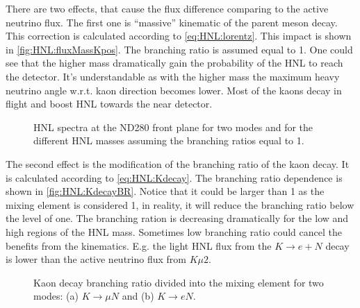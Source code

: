 \documentclass[../main.tex]{subfiles}
\begin{document}
There are two effects, that cause the flux difference comparing to the active neutrino flux. The first one is ``massive'' kinematic of the parent meson decay. This correction is calculated according to \autoref{eq:HNL:lorentz}. This impact is shown in \autoref{fig:HNL:fluxMassKpos}. The branching ratio is assumed equal to 1. One could see that the higher mass dramatically gain the probability of the HNL to reach the detector. It's understandable as with the higher mass the maximum heavy neutrino angle w.r.t. kaon direction becomes lower. Most of the kaons decay in flight and boost HNL towards the near detector.

\begin{figure}[!ht]
    \begin{minipage}{0.49\linewidth}
    \end{minipage}
    \hfill
    \begin{minipage}{0.49\linewidth}
    \end{minipage}
    \caption{HNL spectra at the ND280 front plane for two modes and for the different HNL masses assuming the branching ratios equal to 1.}
    \label{fig:HNL:fluxMassKpos}
\end{figure}

The second effect is the modification of the branching ratio of the kaon decay. It is calculated according to \autoref{eq:HNL:Kdecay}. The branching ratio dependence is shown in \autoref{fig:HNL:KdecayBR}. Notice that it could be larger than 1 as the mixing element is considered 1, in reality, it will reduce the branching ratio below the level of one. The branching ration is decreasing dramatically for the low and high regions of the HNL mass. Sometimes low branching ratio could cancel the benefits from the kinematics. E.g. the light HNL flux from the $K\to e+N$ decay is lower than the active neutrino flux from $K\mu2$.

\begin{figure}[!ht]
    \begin{minipage}[!ht]{0.49\linewidth}
    \end{minipage}
    \hfill
    \begin{minipage}[!ht]{0.49\linewidth}
    \end{minipage}
    \caption{Kaon decay branching ratio divided into the mixing element for two modes: (a) $K\to \mu N$ and (b) $K\to eN$.}
    \label{fig:HNL:KdecayBR}
\end{figure}
\end{document}
